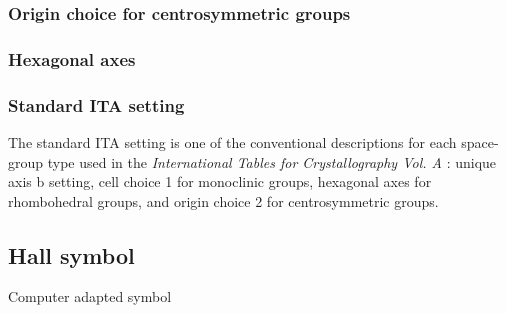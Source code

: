 \subsubsection{Origin choice for centrosymmetric groups}

\subsubsection{Hexagonal axes}

\subsubsection{Standard ITA setting}

The standard ITA setting is one of the conventional descriptions for each space-group type used in the \textit{International Tables for Crystallography Vol. A} \cite{ITA2016}: unique axis b setting, cell choice 1 for monoclinic groups, hexagonal axes for rhombohedral groups, and origin choice 2 for centrosymmetric groups.


\subsection{Hall symbol}

Computer adapted symbol
